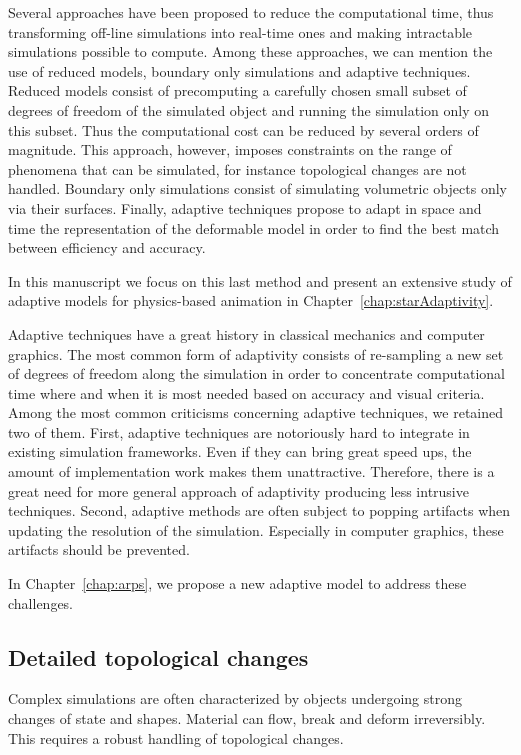 Several approaches have been proposed to reduce the computational time, thus transforming off-line simulations into real-time ones and making intractable simulations possible to compute. 
Among these approaches, we can mention the use of reduced models, boundary only simulations and adaptive techniques. 
Reduced models consist of precomputing a carefully chosen small subset of degrees of freedom of the simulated object and running the simulation only on this subset. 
Thus the computational cost can be reduced by several orders of magnitude. 
This approach, however, imposes constraints on the range of phenomena that can be simulated, for instance topological changes are not handled. 
Boundary only simulations consist of simulating volumetric objects only via their surfaces. 
Finally, adaptive techniques propose to adapt in space and time the representation of the deformable model in order to find the best match between efficiency and accuracy. 


In this manuscript we focus on this last method and present an extensive study of adaptive models for physics-based animation in Chapter~\ref{chap:starAdaptivity}.


Adaptive techniques have a great history in classical mechanics and computer graphics. The most common form of adaptivity consists of re-sampling a new set of degrees of freedom along the simulation in order to concentrate computational time where and when it is most needed based on accuracy and visual criteria. Among the most common criticisms concerning adaptive techniques, we retained two of them. First, adaptive techniques are notoriously hard to integrate in existing simulation frameworks. Even if they can bring great speed ups, the amount of implementation work makes them unattractive. Therefore, there is a great need for more general approach of adaptivity producing less intrusive techniques. Second, adaptive methods are often subject to popping artifacts when updating the resolution of the simulation. Especially in computer graphics, these artifacts should be prevented.


In Chapter~\ref{chap:arps}, we propose a new adaptive model to address these challenges.

\subsection{Detailed topological changes}

Complex simulations are often characterized by objects undergoing strong changes of state and shapes. Material can flow, break and deform irreversibly. This requires a robust handling of topological changes.

